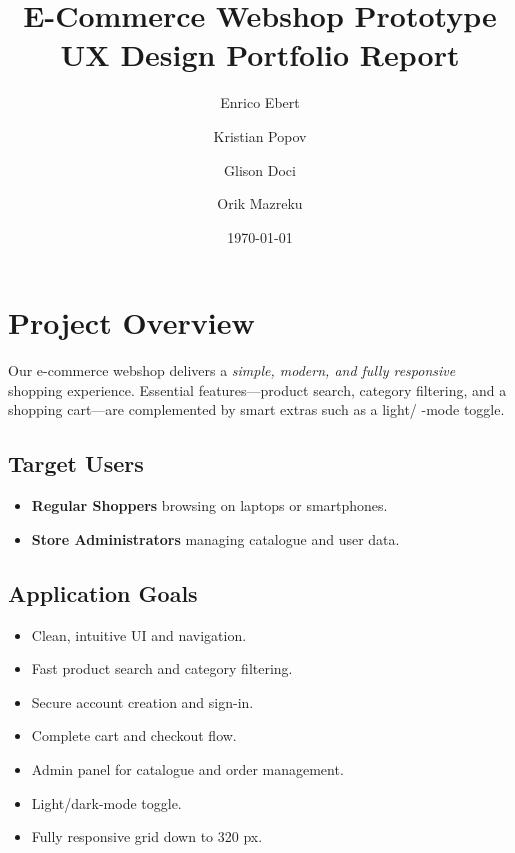 \documentclass[11pt,a4paper]{article}
\begin{document}
	
	\title{\textbf{E-Commerce Webshop Prototype\\UX Design Portfolio Report}}
	\author{Enrico Ebert \and Kristian Popov \and Glison Doci \and Orik Mazreku}
	\date{\today}
	\maketitle
	\thispagestyle{empty}
	\newpage
	
	\setcounter{tocdepth}{2}
	\tableofcontents
	\newpage
	
	\section{Project Overview}
	Our e-commerce webshop delivers a \emph{simple, modern, and fully responsive} shopping experience. Essential features—product search, category filtering, and a shopping cart—are complemented by smart extras such as a light/
	-mode toggle.
	
	\subsection*{Target Users}
	\begin{itemize}
		\item \textbf{Regular Shoppers} browsing on laptops or smartphones.
		\item \textbf{Store Administrators} managing catalogue and user data.
	\end{itemize}
	
	\subsection*{Application Goals}
	\begin{itemize}
		\item Clean, intuitive UI and navigation.
		\item Fast product search and category filtering.
		\item Secure account creation and sign-in.
		\item Complete cart and checkout flow.
		\item Admin panel for catalogue and order management.
		\item Light/dark-mode toggle.
		\item Fully responsive grid down to 320 px.
	\end{itemize}
	
\end{document}
